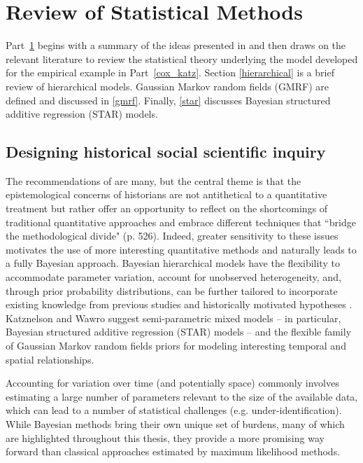 
\chapter{Review of Statistical Methods}
\label{lit_review}

Part~\ref{lit_review} begins with a summary of the ideas presented in 
 and then draws on the relevant literature 
to review the statistical theory underlying the model developed for the empirical 
example in Part~\ref{cox_katz}. Section \ref{hierarchical} is a brief review of 
hierarchical models. Gaussian Markov random fields (GMRF) are defined and 
discussed in \ref{gmrf}. Finally, \ref{star} discusses Bayesian structured additive 
regression (STAR) models. 

\section{Designing historical social scientific inquiry}
\label{wawro}

The recommendations of  are many, but the central 
theme is that the epistemological concerns of historians are not antithetical to a 
quantitative treatment but rather offer an opportunity to reflect on the shortcomings 
of traditional quantitative approaches and embrace different techniques that ``bridge 
the methodological divide" (p. 526). Indeed, greater sensitivity to these issues motivates 
the use of more interesting quantitative methods and naturally leads to a fully Bayesian 
approach.  Bayesian hierarchical models have the flexibility to accommodate parameter 
variation, account for unobserved heterogeneity, and, through prior probability distributions, 
can be further tailored to incorporate existing knowledge from previous studies and 
historically motivated hypotheses  \cite{wawro_designing_2014, goodrich_designing_2012}. 
Katznelson and Wawro suggest  semi-parametric mixed models -- in particular,  Bayesian 
structured additive regression (STAR) models -- and the flexible family of Gaussian Markov 
random fields priors for modeling interesting temporal and spatial relationships.

Accounting for variation over time (and potentially space) commonly involves estimating 
a large number of parameters relevant to the size of the available data, which can lead 
to a number of statistical challenges (e.g. under-identification). While Bayesian methods 
bring their own unique set of burdens, many of which are highlighted throughout this 
thesis, they provide a more promising way forward than classical approaches estimated 
by maximum likelihood methods. 


